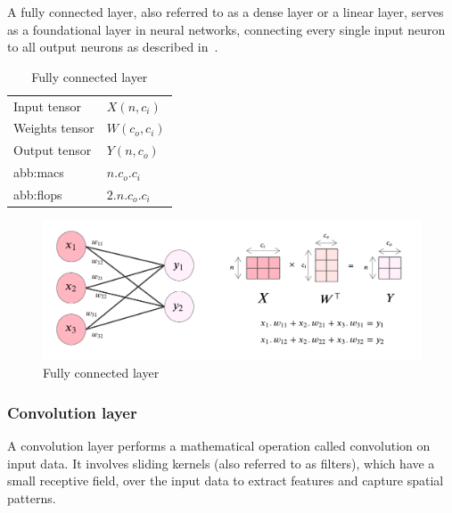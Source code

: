             A fully connected layer, also referred to as a dense layer or a linear layer, serves as a foundational layer in neural networks, connecting every single input neuron to all output neurons as described in~.
            
            \begin{table}[hbt!]
                \caption{Fully connected layer}
                \begin{tabularx}{\textwidth}{@{}XX@{}}
                \toprule
                  Input tensor  &  $X(n,c_i)$\\
                  Weights tensor  &  $W(c_o, c_i)$\\
                  Output tensor &  $Y(n,c_o)$\\
                  \gls{abb:macs}  &  $n.c_o.c_i$\\
                  \gls{abb:flops} &  $2.n.c_o.c_i$\\
                \bottomrule
                \end{tabularx}
            \end{table}

            \begin{figure}[hbt!]
                \begin{center}
                \includegraphics[width=.9\textwidth]{assets/images/dense.png}
                \end{center}
                \caption{Fully connected layer}%
                \label{fig:hw-nas:dl:dense}
            \end{figure}
            
        \subsubsection{Convolution layer}
            A convolution layer performs a mathematical operation called convolution on input data. It involves sliding kernels (also referred to as filters), which have a small receptive field, over the input data to extract features and capture spatial patterns.
            
